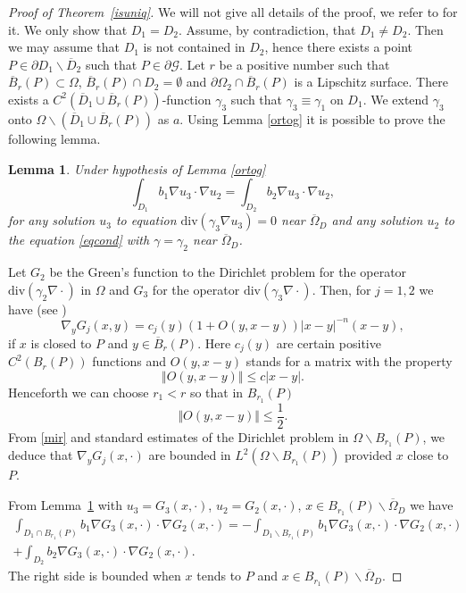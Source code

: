 \documentclass[10pt, a4paper, twoside, openright]{book}
\theoremstyle{definition}
\theoremstyle{plain}
\theoremstyle{plain}
\theoremstyle{plain}
\theoremstyle{plain}
\theoremstyle{plain}
\newtheorem{lemma}[subsection]{Lemma}
\theoremstyle{plain}
\theoremstyle{plain}
\theoremstyle{plain}
\begin{document}
\begin{proof}[Proof of Theorem~\ref{isuniq}]
We will not give all details of the proof,
we refer to \cite{Is88, Is98} for it.
We  only show that $D_1=D_2$.
Assume, by contradiction, that $D_1\neq D_2$.
Then we may assume that $D_1$ is not contained in $D_2$,
hence there exists a point $P\in\partial D_1\smallsetminus\overline{D}_2$
such that $P\in\partial\mathcal{G}$.
Let $r$ be a positive number such that
$\overline{B}_r(P)\subset\Omega$,
$\overline{B}_r(P)\cap D_2=\emptyset$ and $\partial\Omega_2\cap\overline{B}_r(P)$
is a Lipschitz surface.
There exists a $C^2(\overline{D}_1\cup\overline{B}_r(P))$-function
$\gamma_3$ such that $\gamma_3\equiv\gamma_1$ on $D_1$.
We extend $\gamma_3$ onto
$\Omega\smallsetminus(\overline{D}_1\cup\overline{B}_r(P))$ as $a$.
Using Lemma \ref{ortog} it is possible to prove the following lemma.
\begin{lemma}
\label{ortog2}
Under hypothesis of Lemma \ref{ortog}
$$\int_{D_1}b_1\nabla u_3\cdot\nabla u_2
=\int_{D_2}b_2\nabla u_3\cdot\nabla u_2,$$
for any solution $u_3$ to equation $\mathrm{div}(\gamma_3\nabla u_3)=0$
near $\overline{\Omega}_D$ and any solution $u_2$
to the equation \eqref{eqcond} with $\gamma=\gamma_2$
near $\overline{\Omega}_D$.
\end{lemma}
Let $G_2$ be the Green's function to the Dirichlet problem for the
operator $\mathrm{div}(\gamma_2\nabla\cdot)$
in $\Omega$ and $G_3$ for the operator
$\mathrm{div}(\gamma_3\nabla\cdot)$. Then, for $j=1,2$ we have
(see \cite{Mi})
\begin{equation}
\label{mir}
\nabla_y G_j(x,y)=c_j(y)\left(1+O(y,x-y)\right)|x-y|^{-n}(x-y),
\end{equation}
if $x$ is closed to $P$ and $y\in\overline B_r(P)$.
Here $c_j(y)$ are certain positive $C^2(B_r(P))$ functions
and $O(y,x-y)$ stands for a matrix with the property
$$\Vert O(y,x-y)\Vert\leq c|x-y|.$$
Henceforth we can choose $r_1<r$ so that in $B_{r_1}(P)$
$$\Vert O(y,x-y)\Vert\leq\frac{1}{2}.$$
From \eqref{mir} and standard estimates of the Dirichlet problem in
$\Omega\smallsetminus B_{r_1}(P)$, we deduce that
$\nabla_y G_j(x,\cdot)$ are bounded in $L^2(\Omega\smallsetminus B_{r_1}(P))$
provided $x$ close to $P$.

From Lemma~\ref{ortog2} with $u_3=G_3(x,\cdot)$, $u_2=G_2(x,\cdot)$,
$x\in B_{r_1}(P)\smallsetminus\overline\Omega_D$ we have
\begin{multline*}
\int_{D_1\cap B_{r_1}(P)}b_1\nabla G_3(x,\cdot)\cdot\nabla G_2(x,\cdot)=
-\int_{D_1\smallsetminus B_{r_1}(P)}b_1\nabla G_3(x,\cdot)\cdot\nabla G_2(x,\cdot)\\
+\int_{D_2}b_2\nabla G_3(x,\cdot)\cdot\nabla G_2(x,\cdot).
\end{multline*}
The right side is bounded when $x$ tends to $P$ and
$x\in B_{r_1}(P)\smallsetminus\overline\Omega_D$.


\end{proof}
\end{document}
